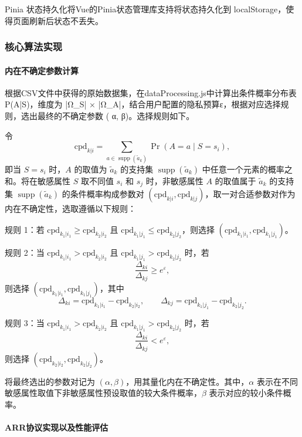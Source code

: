 \documentclass{cumcmthesis}
\numberwithin{equation}{section}
\numberwithin{figure}{section}
\numberwithin{table}{section}
\begin{document}
Pinia 状态持久化将Vue的Pinia状态管理库支持将状态持久化到 localStorage，使得页面刷新后状态不丢失。

\subsubsection{核心算法实现}

\paragraph{内在不确定参数计算}

根据CSV文件中获得的原始数据集，在dataProcessing.js中计算出条件概率分布表 P(A|S)，维度为 |Ω\_S| × |Ω\_A|，结合用户配置的隐私预算ε，根据对应选择规则，选出最终的不确定参数 ( α, β)。选择规则如下。

令
\[
\mathrm{cpd}_{k|i}
=\sum_{a\in \operatorname{supp}(\tilde{a}_k)}
\Pr(A=a\mid S=s_i),
\]
即当 \(S=s_i\) 时，\(A\) 的取值为 \(\tilde{a}_k\) 的支持集 \(\operatorname{supp}(\tilde{a}_k)\) 中任意一个元素的概率之和。将在敏感属性 \(S\) 取不同值 \(s_i\) 和 \(s_j\) 时，非敏感属性 \(A\) 的取值属于 \(\tilde{a}_k\) 的支持集 \(\operatorname{supp}(\tilde{a}_k)\) 的条件概率构成参数对 \((\mathrm{cpd}_{k|i},\mathrm{cpd}_{k|j})\)，取一对合适参数对作为内在不确定性，选取遵循以下规则：

规则 1：若 \(\mathrm{cpd}_{k_1|i_1}\ge \mathrm{cpd}_{k_2|i_2}\) 且 \(\mathrm{cpd}_{k_1|j_1}\le \mathrm{cpd}_{k_2|j_2}\)，则选择 \((\mathrm{cpd}_{k_1|i_1},\mathrm{cpd}_{k_1|j_1})\)。

规则 2：当 \(\mathrm{cpd}_{k_1|i_1}>\mathrm{cpd}_{k_2|i_2}\) 且 \(\mathrm{cpd}_{k_1|j_1}>\mathrm{cpd}_{k_2|j_2}\) 时，若
\[
\frac{\Delta_{ki}}{\Delta_{kj}}\ge e^{\varepsilon},
\]
则选择 \((\mathrm{cpd}_{k_1|i_1},\mathrm{cpd}_{k_1|j_1})\)，其中
\[
\Delta_{ki}=\mathrm{cpd}_{k_1|i_1}-\mathrm{cpd}_{k_2|i_2},\qquad
\Delta_{kj}=\mathrm{cpd}_{k_1|j_1}-\mathrm{cpd}_{k_2|j_2}.
\]

规则 3：当 \(\mathrm{cpd}_{k_1|i_1}>\mathrm{cpd}_{k_2|i_2}\) 且 \(\mathrm{cpd}_{k_1|j_1}>\mathrm{cpd}_{k_2|j_2}\) 时，若
\[
\frac{\Delta_{ki}}{\Delta_{kj}}< e^{\varepsilon},
\]
则选择 \((\mathrm{cpd}_{k_2|i_2},\mathrm{cpd}_{k_2|j_2})\)。

将最终选出的参数对记为 \((\alpha,\beta)\)，用其量化内在不确定性。其中，\(\alpha\) 表示在不同敏感属性取值下非敏感属性预设取值的较大条件概率，\(\beta\) 表示对应的较小条件概率。

\paragraph{ARR协议实现以及性能评估}
\end{document}
